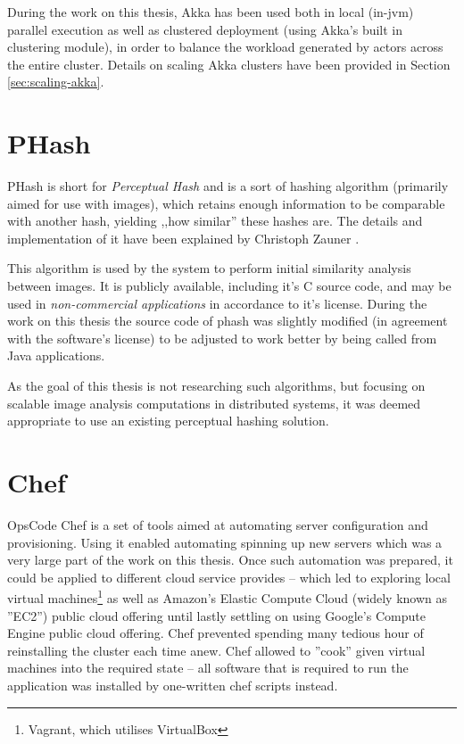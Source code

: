 During the work on this thesis, Akka has been used both in local (in-jvm) parallel execution as well as clustered deployment (using Akka's built in clustering module), in order to balance the workload generated by actors across the entire cluster. Details on scaling Akka clusters have been provided in Section \ref{sec:scaling-akka}.

\section{PHash}
\label{sec:phash}
PHash is short for \textit{Perceptual Hash} and is a sort of hashing algorithm (primarily aimed for use with images), which retains enough information to be comparable with another hash, yielding ,,how similar'' these hashes are. The details and implementation of it have been explained by Christoph Zauner \cite{phash}.

This algorithm is used by the system to perform initial similarity analysis between images. It is publicly available, including it's C source code, and may be used in \textit{non-commercial applications} in accordance to it's license. During the work on this thesis the source code of phash was slightly modified (in agreement with the software's license) to be adjusted to work better by being called from Java applications.

As the goal of this thesis is not researching such algorithms, but focusing on scalable image analysis computations in distributed systems, it was deemed appropriate to use an existing perceptual hashing solution.

\section{Chef}
\label{sec:chef}
OpsCode Chef is a set of tools aimed at automating server configuration and provisioning. Using it enabled automating spinning up new servers which was a very large part of the work on this thesis. Once such automation was prepared, it could     be applied to different cloud service provides -- which led to exploring local virtual machines\footnote{Vagrant, which utilises VirtualBox} as well as Amazon's Elastic Compute Cloud (widely known as ''EC2'') public cloud offering until lastly settling on using Google's Compute Engine public cloud offering. Chef prevented spending many  tedious hour of reinstalling the cluster each time anew. Chef allowed to ''cook'' given virtual machines into the required state -- all software that is required to run the application was installed by one-written chef scripts instead.

